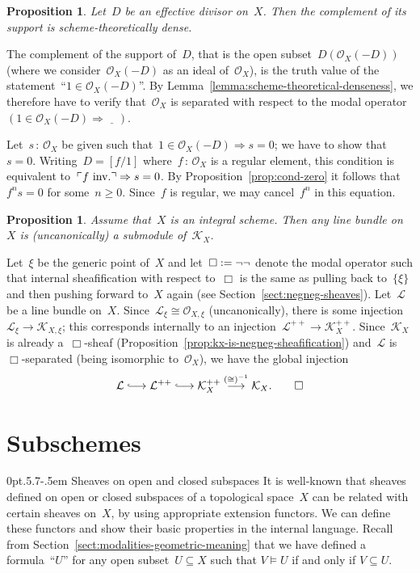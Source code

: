 \documentclass[10pt,reqno,a4paper]{amsbook}
\makeatletter
\theoremstyle{definition}
\theoremstyle{plain}
\newtheorem{prop}[defn]{Proposition}
\theoremstyle{remark}
\renewcommand{\O}{\mathcal{O}}
\newcommand{\K}{\mathcal{K}}
\renewcommand{\L}{\mathcal{L}}
\newcommand{\placeholder}{\underline{\quad}}
\newcommand{\?}{\,{:}\,}
\renewcommand{\_}{\mathpunct{.}\,}
\newcommand{\speak}[1]{\ulcorner\text{\textnormal{#1}}\urcorner}
\newcommand{\lhra}{\ensuremath{\lhook\joinrel\relbar\joinrel\rightarrow}}
\newcommand{\inv}{inv.\@}
\newcommand{\defeq}{\vcentcolon=}
\renewenvironment{proof}[1][\proofname]{\par
  \pushQED{\qed}%
  \normalfont \topsep6\p@\@plus6\p@\relax
  \trivlist
  \item[\hskip\labelsep
        \itshape
    #1\@addpunct{.}]\ignorespaces
}{%
  \popQED\endtrivlist\@endpefalse
}
\def\subsection{\@startsection{subsection}{2}%
  {0pt}{.5\linespacing\@plus.7\linespacing}{-.5em}%
  {\normalfont\bfseries}}
\makeatother
\begin{document}
\begin{prop}Let~$D$ be an effective divisor on~$X$. Then the complement of its
support is scheme-theoretically dense.\end{prop}
\begin{proof}The complement of the support of~$D$, that is the open
subset~$D(\O_X(-D))$ (where we consider~$\O_X(-D)$ as an ideal of~$\O_X$), is
the truth value of the statement~``$1 \in \O_X(-D)$''. By
Lemma~\ref{lemma:scheme-theoretical-denseness}, we therefore have to verify
that~$\O_X$ is separated with respect to the modal operator~$(1 \in \O_X(-D)
\Rightarrow \placeholder)$.

Let~$s \? \O_X$ be given such that~$1 \in \O_X(-D) \Rightarrow s = 0$; we have
to show that~$s = 0$. Writing~$D = [f/1]$ where~$f \? \O_X$ is a regular
element, this condition is equivalent to~$\speak{$f$ \inv} \Rightarrow s = 0$.
By Proposition~\ref{prop:cond-zero} it follows that~$f^n s = 0$ for some~$n
\geq 0$. Since~$f$ is regular, we may cancel~$f^n$ in this equation.
\end{proof}

\begin{prop}Assume that~$X$ is an integral scheme. Then any line bundle on~$X$
is (uncanonically) a submodule of~$\K_X$.\end{prop}
\begin{proof}Let~$\xi$ be the generic point of~$X$ and let~$\Box \defeq \neg\neg$
denote the modal operator such that internal sheafification with respect
to~$\Box$ is the same as pulling back to~$\{\xi\}$ and then pushing forward
to~$X$ again (see Section~\ref{sect:negneg-sheaves}). Let~$\L$ be a line bundle on~$X$. Since~$\L_\xi \cong
\O_{X,\xi}$ (uncanonically), there is some injection~$\L_\xi \to \K_{X,\xi}$;
this corresponds internally to an injection~$\L^{++} \to \K_X^{++}$.
Since~$\K_X$ is already a~$\Box$-sheaf
(Proposition~\ref{prop:kx-is-negneg-sheafification}) and~$\L$ is~$\Box$-separated
(being isomorphic to~$\O_X$), we have the global injection
\[ \L \lhra \L^{++} \lhra \K_X^{++} \stackrel{({\cong})^{-1}}{\longrightarrow} \K_X. \qedhere \]
\end{proof}


\section{Subschemes}

\subsection{Sheaves on open and closed subspaces} It is well-known that sheaves
defined on open or closed subspaces of a topological space~$X$ can be related
with certain sheaves on~$X$, by using appropriate extension functors. We can
define these functors and show their basic properties in the internal
language. Recall from Section~\ref{sect:modalities-geometric-meaning} that we
have defined a formula~``$U$'' for any open subset~$U \subseteq X$ such that
$V \models U$ if and only if $V \subseteq U$.
\end{document}
